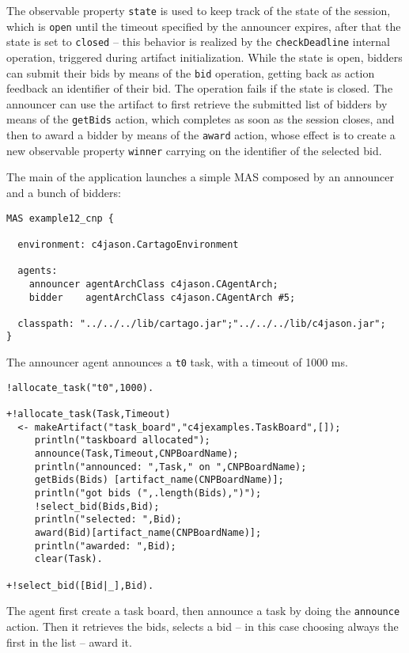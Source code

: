 \documentclass[11pt]{report}
\newcommand\code[1]{{\small{\mbox{\texttt{{#1}}}}}}
\begin{document}
%
\noindent The observable property \code{state} is used to keep track of the state of the session, which is \code{open} until the timeout specified by the announcer expires, after that the state is set to \code{closed} -- this behavior is realized by the \code{checkDeadline} internal operation, triggered during artifact initialization.
%
While the state is open, bidders can submit their bids by means of the \code{bid} operation, getting back as action feedback an identifier of their bid.
%
The operation fails if the state is closed.
%
The announcer can use the artifact to first retrieve the submitted list of bidders by means of the \code{getBids} action, which completes as soon as the session closes,  and then to award a bidder by means of the \code{award} action, whose effect is to create a new observable property \code{winner} carrying on the identifier of the selected bid.
%


\medskip


%
\noindent The main of the application launches a simple MAS composed by an announcer and a bunch of bidders:
%

{\small{\begin{verbatim}
MAS example12_cnp {

  environment: c4jason.CartagoEnvironment

  agents:     	  
    announcer agentArchClass c4jason.CAgentArch;
    bidder    agentArchClass c4jason.CAgentArch #5;
	  
  classpath: "../../../lib/cartago.jar";"../../../lib/c4jason.jar";    
}
\end{verbatim}}}

\noindent The announcer agent announces a \code{t0} task, with a timeout of 1000 ms.
%
{\small{\begin{verbatim}
!allocate_task("t0",1000).

+!allocate_task(Task,Timeout)
  <- makeArtifact("task_board","c4jexamples.TaskBoard",[]);
     println("taskboard allocated");
     announce(Task,Timeout,CNPBoardName);
     println("announced: ",Task," on ",CNPBoardName);
     getBids(Bids) [artifact_name(CNPBoardName)];
     println("got bids (",.length(Bids),")");
     !select_bid(Bids,Bid);
     println("selected: ",Bid);
     award(Bid)[artifact_name(CNPBoardName)];
     println("awarded: ",Bid);
     clear(Task).
	   
+!select_bid([Bid|_],Bid).
\end{verbatim}}}
%
\noindent The agent first create a task board, then announce a task by doing the \code{announce} action.
%
Then it retrieves the bids, selects a bid -- in this case choosing always the first in the list -- award it.
\end{document}
